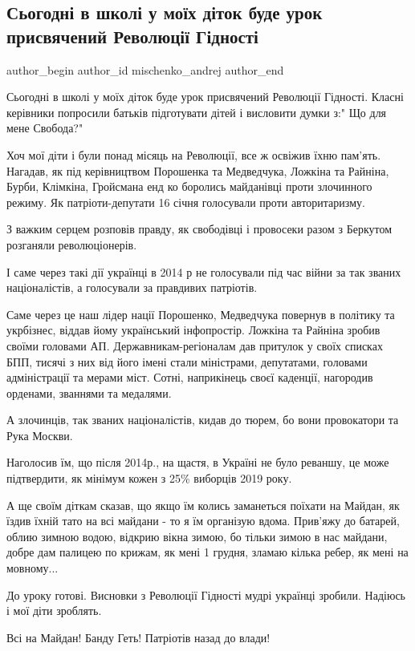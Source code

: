 
 
 
 
 
 
\subsection{Сьогодні в школі у моїх діток буде урок присвячений Революції Гідності}
\label{sec:22_11_2021.fb.mischenko_andrej.1.revgidnosti}
 
\ifcmt
 author_begin
   author_id mischenko_andrej
 author_end
\fi

Сьогодні в школі у моїх діток буде урок присвячений Революції Гідності. Класні
керівники попросили батьків підготувати дітей і висловити думки з:" Що для мене
Свобода?"

Хоч мої діти і були понад місяць на Революції, все ж освіжив їхню пам'ять.
Нагадав, як під керівництвом Порошенка та Медведчука, Ложкіна та Райніна,
Бурби, Клімкіна, Гройсмана енд ко боролись майданівці проти злочинного режиму.
Як патріоти-депутати 16 січня голосували проти авторитаризму. 

З важким серцем розповів правду, як свободівці і провосеки разом з Беркутом
розганяли революціонерів. 

І саме через такі дії українці в 2014 р не голосували під час війни за так
званих націоналістів, а голосували за правдивих патріотів. 

Саме через це наш лідер нації Порошенко, Медведчука повернув в політику та
укрбізнес, віддав йому український інфопростір. Ложкіна та Райніна зробив
своїми головами АП. Державникам-регіоналам дав притулок у своїх списках БПП,
тисячі з них від його імені стали міністрами, депутатами, головами
адміністрації та мерами міст. Сотні, наприкінець своєї каденції, нагородив
орденами, званнями та медалями. 

А злочинців, так званих націоналістів, кидав до тюрем, бо вони провокатори та
Рука Москви. 

Наголосив їм, що після 2014р., на щастя, в Україні не було реваншу, це може
підтвердити, як мінімум кожен з 25\% виборців 2019 року. 

А ще своїм діткам сказав, що якщо їм колись заманеться поїхати на Майдан, як
їздив їхній тато на всі майдани - то я їм організую вдома. Прив'яжу до батарей,
облию зимною водою, відкрию вікна зимою, бо тільки зимою в нас майдани, добре
дам палицею по крижам, як мені 1 грудня, зламаю кілька ребер, як мені на
мовному... 

До уроку готові. Висновки з Революції Гідності мудрі українці зробили. Надіюсь
і мої діти зроблять. 

Всі на Майдан! Банду Геть! Патріотів назад до влади!

